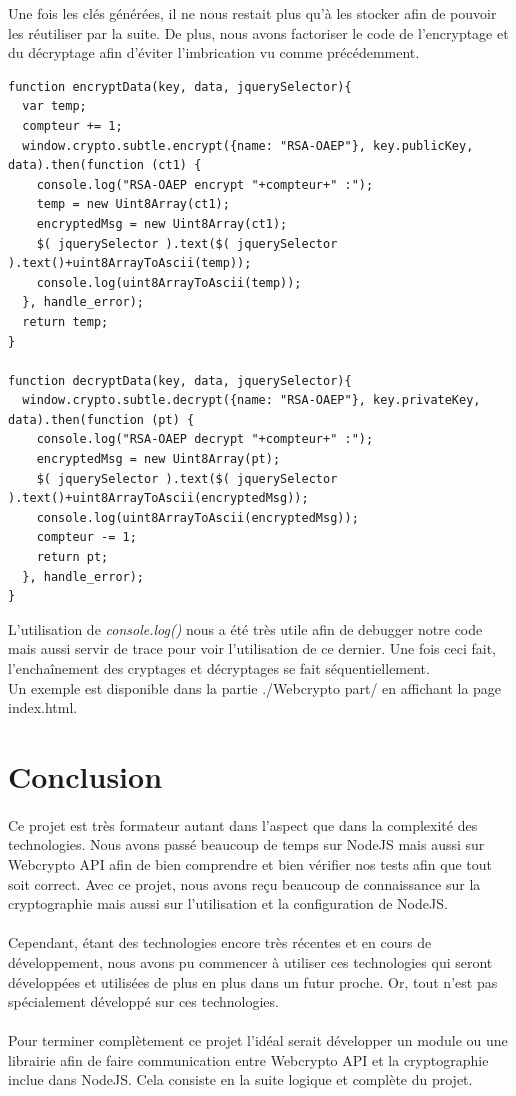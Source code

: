 \documentclass[a4paper,12pt]{report}
\begin{document}
	Une fois les clés générées, il ne nous restait plus qu'à les stocker afin de pouvoir les réutiliser par la suite. De plus, nous avons factoriser le code de l'encryptage et du décryptage afin d'éviter l'imbrication vu comme précédemment. 
		\begin{lstlisting}
function encryptData(key, data, jquerySelector){
  var temp;
  compteur += 1;
  window.crypto.subtle.encrypt({name: "RSA-OAEP"}, key.publicKey, data).then(function (ct1) {
    console.log("RSA-OAEP encrypt "+compteur+" :");
    temp = new Uint8Array(ct1);
    encryptedMsg = new Uint8Array(ct1);
    $( jquerySelector ).text($( jquerySelector ).text()+uint8ArrayToAscii(temp));
    console.log(uint8ArrayToAscii(temp));
  }, handle_error);
  return temp;
}

function decryptData(key, data, jquerySelector){
  window.crypto.subtle.decrypt({name: "RSA-OAEP"}, key.privateKey, data).then(function (pt) {
    console.log("RSA-OAEP decrypt "+compteur+" :");
    encryptedMsg = new Uint8Array(pt);
    $( jquerySelector ).text($( jquerySelector ).text()+uint8ArrayToAscii(encryptedMsg));
    console.log(uint8ArrayToAscii(encryptedMsg));
    compteur -= 1;
    return pt;
  }, handle_error);
}	
	\end{lstlisting}
	L'utilisation de \textit{console.log()} nous a été très utile afin de debugger notre code mais aussi servir de trace pour voir l'utilisation de ce dernier. Une fois ceci fait, l'enchaînement des cryptages et décryptages se fait séquentiellement.\\
	Un exemple est disponible dans la partie ./Webcrypto part/ en affichant la page index.html.

\newpage	
\section*{Conclusion}
\paragraph*{}
Ce projet est très formateur autant dans l'aspect que dans la complexité des technologies. Nous avons passé beaucoup de temps sur NodeJS mais aussi sur Webcrypto API afin de bien comprendre et bien vérifier nos tests afin que tout soit correct. Avec ce projet, nous avons reçu beaucoup de connaissance sur la cryptographie mais aussi sur l'utilisation et la configuration de NodeJS.
\paragraph*{}
Cependant, étant des technologies encore très récentes et en cours de développement, nous avons pu commencer à utiliser ces technologies qui seront développées et utilisées de plus en plus  dans un futur proche. Or, tout n'est pas spécialement développé sur ces technologies.
\paragraph*{}
Pour terminer complètement ce projet l'idéal serait développer un module ou une librairie afin de faire communication entre Webcrypto API et la cryptographie inclue dans NodeJS. Cela consiste en la suite logique et complète du projet. 
\end{document}
